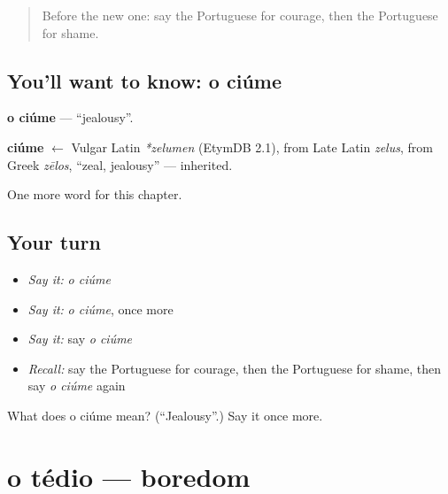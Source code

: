 \label{lesson:PT-C181-ciume}



\begin{quote}
Before the new one: say the Portuguese for courage, then the Portuguese for shame.
\end{quote}

\subsection*{You'll want to know: o ciúme}
\textbf{o ciúme} — \textquotedblleft{}jealousy\textquotedblright{}.

\begin{cousinweb}
\textbf{ciúme} $\leftarrow$ Vulgar Latin \emph{*zelumen} (EtymDB 2.1), from Late Latin \emph{zelus}, from Greek \emph{zēlos}, \textquotedblleft{}zeal, jealousy\textquotedblright{} — inherited.
\end{cousinweb}

\begin{grammarlens}[title={What you've built}]
One more word for this chapter.
\end{grammarlens}

\subsection*{Your turn}
\begin{itemize}
\raggedright
  \item \emph{Say it:} \emph{o ciúme}
  \item \emph{Say it:} \emph{o ciúme}, once more
  \item \emph{Say it:} say \emph{o ciúme}
  \item \emph{Recall:} say the Portuguese for courage, then the Portuguese for shame, then say \emph{o ciúme} again
\end{itemize}

\begin{tcolorbox}[breakable,colback=teal!4,colframe=teal!35!black,title={Before you move on}]
What does o ciúme mean? (\textquotedblleft{}Jealousy\textquotedblright{}.) Say it once more.
\end{tcolorbox}
\section[o tédio]{o tédio — boredom}

\label{lesson:PT-C181-tedio}



